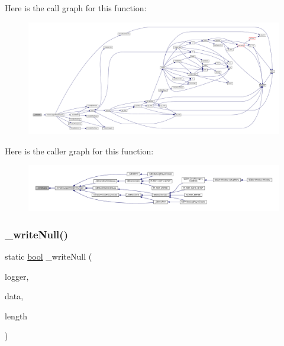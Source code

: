 Here is the call graph for this function\+:
\nopagebreak
\begin{figure}[H]
\begin{center}
\leavevmode
\includegraphics[width=350pt]{video-logger_8c_a163afd173e5992530065bb8ddc2b693e_cgraph}
\end{center}
\end{figure}
Here is the caller graph for this function\+:
\nopagebreak
\begin{figure}[H]
\begin{center}
\leavevmode
\includegraphics[width=350pt]{video-logger_8c_a163afd173e5992530065bb8ddc2b693e_icgraph}
\end{center}
\end{figure}
\mbox{\label{video-logger_8c_a2bb793afc8d7e37b65be24d0c0198d13}} 
\subsubsection{\texorpdfstring{\+\_\+write\+Null()}{\_writeNull()}}
{\footnotesize\ttfamily static \mbox{\hyperlink{libretro_8h_a4a26dcae73fb7e1528214a068aca317e}{bool}} \+\_\+write\+Null (\begin{DoxyParamCaption}\item[{struct m\+Video\+Logger $\ast$}]{logger,  }\item[{const void $\ast$}]{data,  }\item[{size\+\_\+t}]{length }\end{DoxyParamCaption})\hspace{0.3cm}{\ttfamily [static]}}

